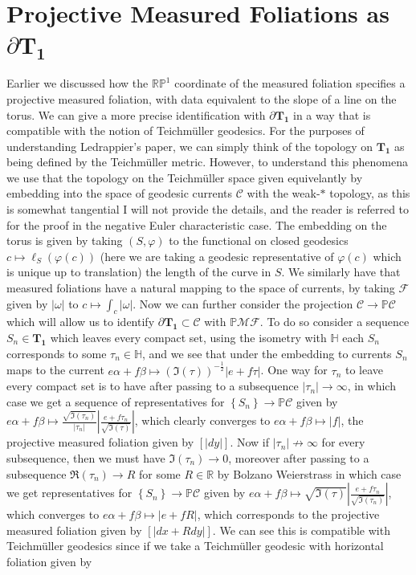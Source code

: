 \documentclass{article}
\newcommand{\set}[1]{\left\{#1\right\}}
\newcommand{\abs}[1]{\left\vert#1\right\vert}
\begin{document}
        \section{Projective Measured Foliations as \(\partial \mathbf{T_1}\)}
        Earlier we discussed how the \(\mathbb{RP}^1\) coordinate of the measured foliation specifies a projective measured foliation, with data equivalent to the slope of a line on the torus. We can give a more precise identification with \(\partial \mathbf{T_1}\) in a way that is compatible with the notion of Teichm\"uller geodesics. For the purposes of understanding Ledrappier's paper, we can simply think of the topology on \(\mathbf{T_1}\) as being defined by the Teichm\"uller metric. However, to understand this phenomena we use that the topology on the Teichm\"uller space given equivelantly by embedding into the space of geodesic currents \(\mathcal{C}\) with the weak-\(*\) topology, as this is somewhat tangential I will not provide the details, and the reader is referred to \cite{Martelli_2025} for the proof in the negative Euler characteristic case. The embedding on the torus is given by taking \((S,\varphi)\) to the functional on closed geodesics \(c \mapsto \ell_S(\varphi(c))\) (here we are taking a geodesic representative of \(\varphi(c)\) which is unique up to translation) the length of the curve in \(S\). We similarly have that measured foliations have a natural mapping to the space of currents, by taking \(\mathcal{F}\) given by \(\abs{\omega}\) to \(c \mapsto \int_c \abs{\omega}\). Now we can further consider the projection \(\mathcal{C} \to \mathbb{P}\mathcal{C}\) which will allow us to identify \(\partial \mathbf{T_1} \subset \mathcal{C}\) with \(\mathbb{P}\mathscr{MF}\). To do so consider a sequence \(S_n \in \mathbf{T_1}\) which leaves every compact set, using the isometry with \(\mathbb{H}\) each \(S_n\) corresponds to some \(\tau_n \in \mathbb{H}\), and we see that under the embedding to currents \(S_n\) maps to the current \(e \alpha + f \beta \mapsto \left(\Im(\tau)\right)^{-\frac12}\abs{e + f \tau}\). One way for \(\tau_n\) to leave every compact set is to have after passing to a subsequence \(\abs{\tau_n} \to \infty\), in which case we get a sequence of representatives for \(\set{S_n} \to \mathbb{P}\mathcal{C}\) given by \(e \alpha + f \beta \mapsto \frac{\sqrt{\Im(\tau_n)}}{\abs{\tau_n}}\left\vert\frac{e + f \tau_n}{\sqrt{\Im(\tau)}}\right\vert\), which clearly converges to \(e \alpha + f \beta \mapsto \abs{f}\), the projective measured foliation given by \([\abs{dy}]\). Now if \(\abs{\tau_n} \not \to \infty\) for every subsequence, then we must have \(\Im(\tau_n) \to 0\), moreover after passing to a subsequence \(\Re(\tau_n) \to R\) for some \(R \in \mathbb{R}\) by Bolzano Weierstrass in which case we get representatives for \(\set{S_n} \to \mathbb{P}\mathcal{C}\) given by \(e \alpha + f \beta \mapsto \sqrt{\Im(\tau)}\left\vert\frac{e + f \tau_n}{\sqrt{\Im(\tau_n)}}\right\vert\), which converges to \(e \alpha + f \beta \mapsto \abs{e + fR}\), which corresponds to the projective measured foliation given by \([\abs{dx + Rdy}]\). We can see this is compatible with Teichm\"uller geodesics since if we take a Teichm\"uller geodesic with horizontal foliation given by 
\end{document}
